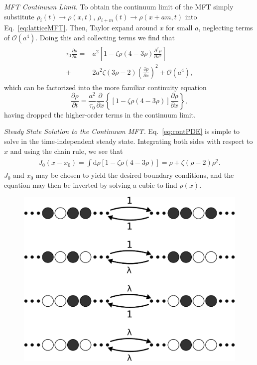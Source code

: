 \documentclass[
reprint,
 amsmath,amssymb,
 aps,
 prl,
]{revtex4-1}
\newcommand{\partDeriv}[2]{\frac{\partial #1}{\partial #2}}
\begin{document}
\textit{MFT Continuum Limit.} To obtain the continuum limit of the MFT simply substitute $\rho_i(t) \rightarrow \rho(x, t)$, $\rho_{i+m}(t) \rightarrow \rho(x + am, t)$ into Eq.~\ref{eq:latticeMFT}.
Then, Taylor expand around $x$ for small $a$, neglecting terms of $\mathcal{O}(a^4)$. Doing this and collecting terms we find that
\begin{align}
 \begin{split}
  \tau_0 \partDeriv{\rho}{t} =& a^2 \left[ 1-\zeta \rho (4-3\rho) \partDeriv{^2 \rho}{x^2}  \right] \\
  +& 2 a^2 \zeta (3\rho-2) \left(\partDeriv{\rho}{x}\right)^2 + \mathcal{O}(a^4) ,
 \end{split}
\end{align}
which can be factorized into the more familiar continuity equation
\begin{equation}
\label{eq:contPDE}
 \partDeriv{\rho}{t} = \frac{a^2}{\tau_0} \partDeriv{}{x} \left\{ \left[1 - \zeta \rho\left(4-3\rho\right) \right] \partDeriv{\rho}{x} \right\},
\end{equation}
having dropped the higher-order terms in the continuum limit.

\textit{Steady State Solution to the Continuum MFT.} Eq.~\ref{eq:contPDE} is simple to solve in the time-independent steady state. Integrating both sides with respect to $x$ and using the chain rule, we see that
\begin{align}
 \begin{split}
  J_0 (x-x_0) = \int \! \! \mathrm{d} \rho  \left[1 - \zeta \rho\left(4-3\rho\right) \right]  = \rho + \zeta (\rho - 2) \rho^2 .
 \end{split}
\end{align}
$J_0$ and $x_0$ may be chosen to yield the desired boundary conditions, and the equation may then be inverted by solving a cubic to find $\rho(x)$.

\begin{figure}[h!]
\vspace{0em}
\caption{\label{fig:detailedBalance}
\vspace{1em}}
\includegraphics[width=0.98\linewidth]{../tex-src/images/detailedBalanceDiagram-crop}
    \vspace{-0em}
\end{figure}
\end{document}
